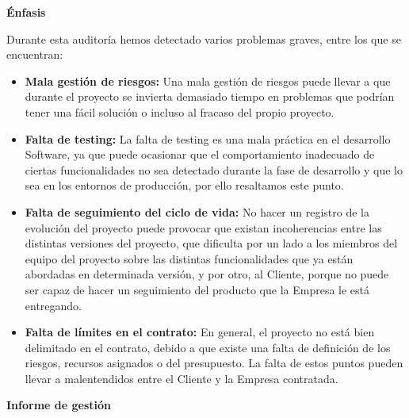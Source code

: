 \documentclass[a4paper,12pt]{report}
\begin{document}
\begin{center}
    {\Large \textbf{Énfasis}}
\end{center}

\vspace{0.5cm}

Durante esta auditoría hemos detectado varios problemas graves, entre los que se encuentran:
\begin{itemize}
    \item \textbf{Mala gestión de riesgos:} Una mala gestión de riesgos puede llevar a que 
    durante el proyecto se invierta demasiado tiempo en problemas que podrían tener una fácil
    solución o incluso al fracaso del propio proyecto.
    \vspace{0.05cm}
    
    \item \textbf{Falta de testing:} La falta de testing es una mala práctica en el desarrollo
    Software, ya que puede ocasionar que el comportamiento inadecuado de ciertas funcionalidades
    no sea detectado durante la fase de desarrollo y que lo sea en los entornos de producción, por
    ello resaltamos este punto.
    \vspace{0.05cm}
    
    \item \textbf{Falta de seguimiento del ciclo de vida:} No hacer un registro de la evolución
    del proyecto puede provocar que existan incoherencias entre las distintas versiones del
    proyecto, que dificulta por un lado a los miembros del equipo del proyecto sobre las distintas
    funcionalidades que ya están abordadas en determinada versión, y por otro, al Cliente, porque
    no puede ser capaz de hacer un seguimiento del producto que la Empresa le está entregando.
    \vspace{0.05cm}
    
    \item \textbf{Falta de límites en el contrato:} En general, el proyecto no está bien delimitado en el contrato, debido a que existe una falta de definición de los riesgos, recursos asignados o del
    presupuesto. La falta de estos puntos pueden llevar a malentendidos entre el Cliente y la Empresa
    contratada.
\end{itemize}

\vspace{1cm}

\begin{center}
    {\Large \textbf{Informe de gestión}}
\end{center}
\end{document}
